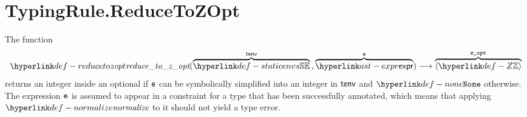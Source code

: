 \begin{mathpar}
\end{mathpar}

\begin{mathpar}
\end{mathpar}

\section{TypingRule.ReduceToZOpt \label{sec:TypingRule.ReduceToZOpt}}
\hypertarget{def-reducetozopt}{}
The function
\[
\reducetozopt(\overname{\staticenvs}{\tenv} \aslsep \overname{\expr}{\ve})
\aslto \overname{\langle\Z\rangle}{\vzopt}
\]
returns an integer inside an optional if $\ve$ can be symbolically simplified into an integer in $\tenv$
and $\None$ otherwise.
The expression $\ve$ is assumed to appear in a constraint for a type that has been successfully annotated,
which means that applying $\normalize$ to it should not yield a type error.

